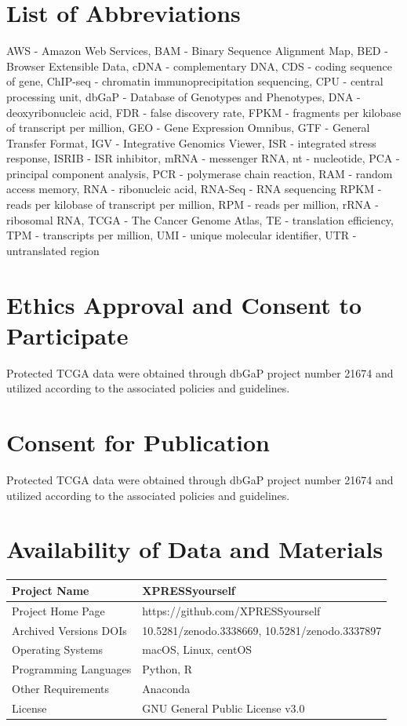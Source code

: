 \documentclass[10pt, oneside]{article}
\begin{document}
\begin{multicols}{2}
\section*{List of Abbreviations}
AWS - Amazon Web Services,
BAM - Binary Sequence Alignment Map,
BED - Browser Extensible Data,
cDNA - complementary DNA,
CDS - coding sequence of gene,
ChIP-seq - chromatin immunoprecipitation sequencing,
CPU - central processing unit,
dbGaP - Database of Genotypes and Phenotypes,
DNA - deoxyribonucleic acid,
FDR - false discovery rate,
FPKM - fragments per kilobase of transcript per million,
GEO - Gene Expression Omnibus,
GTF - General Transfer Format,
IGV - Integrative Genomics Viewer,
ISR - integrated stress response,
ISRIB - ISR inhibitor,
mRNA - messenger RNA,
nt - nucleotide,
PCA - principal component analysis,
PCR - polymerase chain reaction,
RAM - random access memory,
RNA - ribonucleic acid,
RNA-Seq - RNA sequencing
RPKM - reads per kilobase of transcript per million,
RPM - reads per million,
rRNA - ribosomal RNA,
TCGA - The Cancer Genome Atlas,
TE - translation efficiency,
TPM - transcripts per million,
UMI - unique molecular identifier,
UTR - untranslated region

\section*{Ethics Approval and Consent to Participate}
Protected TCGA data were obtained through dbGaP project number 21674 and utilized according to the associated policies and guidelines.

\section*{Consent for Publication}
Protected TCGA data were obtained through dbGaP project number 21674 and utilized according to the associated policies and guidelines.

\section*{Availability of Data and Materials}
\begin{table}[!]
    \centering
{}
\begin{tabular}{p{4cm}p{9cm}}
 Project Name & XPRESSyourself \\
 \hline
 Project Home Page & https://github.com/XPRESSyourself \\
 \hline
 Archived Versions DOIs & 10.5281/zenodo.3338669, 10.5281/zenodo.3337897 \\
 \hline
 Operating Systems & macOS, Linux, centOS \\
 \hline
 Programming Languages & Python, R \\
 \hline
 Other Requirements & Anaconda \\
 \hline
 License & GNU General Public License v3.0 \\
\end{tabular}
\end{table}


\end{multicols}
\end{document}
